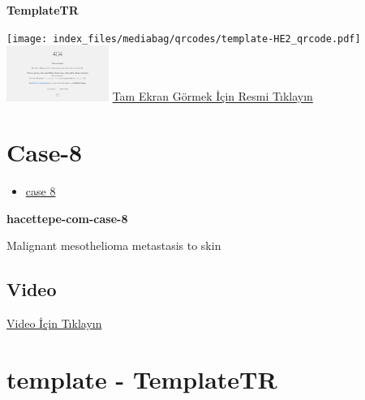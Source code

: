 \documentclass[
  letterpaper,
  DIV=11,
  numbers=noendperiod]{scrreprt}
\providecommand{\tightlist}{%
  \setlength{\itemsep}{0pt}\setlength{\parskip}{0pt}}\usepackage{longtable,booktabs,array}
\begin{document}
\textbf{TemplateTR}

\texttt{[image: index\_files/mediabag/qrcodes/template-HE2\_qrcode.pdf]}
\href{https://images.patolojiatlasi.com/template/HE2.html}{\includegraphics[width=0.25\textwidth,height=\textheight]{./screenshots/thumbnail_template-HE2.png}}
\href{https://images.patolojiatlasi.com/template/HE2.html}{Tam Ekran
Görmek İçin Resmi Tıklayın}

\hypertarget{sec-hacettepe-case-of-the-month-case-8}{%
\section{Case-8}\label{sec-hacettepe-case-of-the-month-case-8}}

\begin{itemize}
\tightlist
\item
  \href{https://www.youtube.com/watch?v=c8pDBHRO7t8&ab_channel=KemalKosemehmetoglu}{case
  8}
\end{itemize}

\textbf{hacettepe-com-case-8}

\begin{tcolorbox}[enhanced jigsaw, breakable, opacitybacktitle=0.6, arc=.35mm, colbacktitle=quarto-callout-tip-color!10!white, colback=white, toptitle=1mm, left=2mm, opacityback=0, colframe=quarto-callout-tip-color-frame, titlerule=0mm, rightrule=.15mm, bottomrule=.15mm, toprule=.15mm, bottomtitle=1mm, title=\textcolor{quarto-callout-tip-color}{\faLightbulb}\hspace{0.5em}{Tanı}, coltitle=black, leftrule=.75mm]

Malignant mesothelioma metastasis to skin

\end{tcolorbox}

\hypertarget{video-7}{%
\subsection{Video}\label{video-7}}

\href{https://www.youtube.com/watch?v=c8pDBHRO7t8}{Video İçin Tıklayın}

\hypertarget{sec-template}{%
\section{template - TemplateTR}\label{sec-template}}
\end{document}
